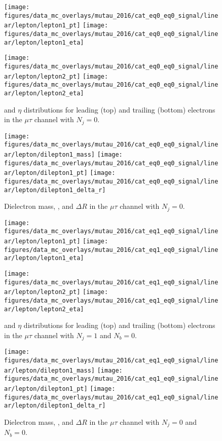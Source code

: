 \begin{figure}[htb!]
    \centering
    \texttt{[image: figures/data\_mc\_overlays/mutau\_2016/cat\_eq0\_eq0\_signal/linear/lepton/lepton1\_pt]}
    \texttt{[image: figures/data\_mc\_overlays/mutau\_2016/cat\_eq0\_eq0\_signal/linear/lepton/lepton1\_eta]}

    \texttt{[image: figures/data\_mc\_overlays/mutau\_2016/cat\_eq0\_eq0\_signal/linear/lepton/lepton2\_pt]}
    \texttt{[image: figures/data\_mc\_overlays/mutau\_2016/cat\_eq0\_eq0\_signal/linear/lepton/lepton2\_eta]}
    \caption{\pt and $\eta$ distributions for leading (top) and trailing
    (bottom) electrons in the $\mu\tau$ channel with $N_{j} = 0$.}
    \label{fig:mutau_1_kinematic}
\end{figure}

\begin{figure}[htb!]
    \centering
    \texttt{[image: figures/data\_mc\_overlays/mutau\_2016/cat\_eq0\_eq0\_signal/linear/lepton/dilepton1\_mass]}
    \texttt{[image: figures/data\_mc\_overlays/mutau\_2016/cat\_eq0\_eq0\_signal/linear/lepton/dilepton1\_pt]}
    \texttt{[image: figures/data\_mc\_overlays/mutau\_2016/cat\_eq0\_eq0\_signal/linear/lepton/dilepton1\_delta\_r]}
    \caption{Dielectron mass, \pt, and $\Delta R$ in the $\mu\tau$ channel
    with $N_{j} = 0$.}
    \label{fig:mutau_1_dilepton}
\end{figure}

\begin{figure}[htb!]
    \centering
    \texttt{[image: figures/data\_mc\_overlays/mutau\_2016/cat\_eq1\_eq0\_signal/linear/lepton/lepton1\_pt]}
    \texttt{[image: figures/data\_mc\_overlays/mutau\_2016/cat\_eq1\_eq0\_signal/linear/lepton/lepton1\_eta]}

    \texttt{[image: figures/data\_mc\_overlays/mutau\_2016/cat\_eq1\_eq0\_signal/linear/lepton/lepton2\_pt]}
    \texttt{[image: figures/data\_mc\_overlays/mutau\_2016/cat\_eq1\_eq0\_signal/linear/lepton/lepton2\_eta]}
    \caption{\pt and $\eta$ distributions for leading (top) and trailing
        (bottom) electrons in the $\mu\tau$ channel with $N_{j} = 1$ and
        $N_{b} = 0$.}
    \label{fig:mutau_2_kinematic}
\end{figure}

\begin{figure}[htb!]
    \centering
    \texttt{[image: figures/data\_mc\_overlays/mutau\_2016/cat\_eq1\_eq0\_signal/linear/lepton/dilepton1\_mass]}
    \texttt{[image: figures/data\_mc\_overlays/mutau\_2016/cat\_eq1\_eq0\_signal/linear/lepton/dilepton1\_pt]}
    \texttt{[image: figures/data\_mc\_overlays/mutau\_2016/cat\_eq1\_eq0\_signal/linear/lepton/dilepton1\_delta\_r]}
    \caption{Dielectron mass, \pt, and $\Delta R$ in the $\mu\tau$ channel
    with $N_{j} = 0$ and $N_{b} = 0$.}
    \label{fig:mutau_2_dilepton}
\end{figure}

